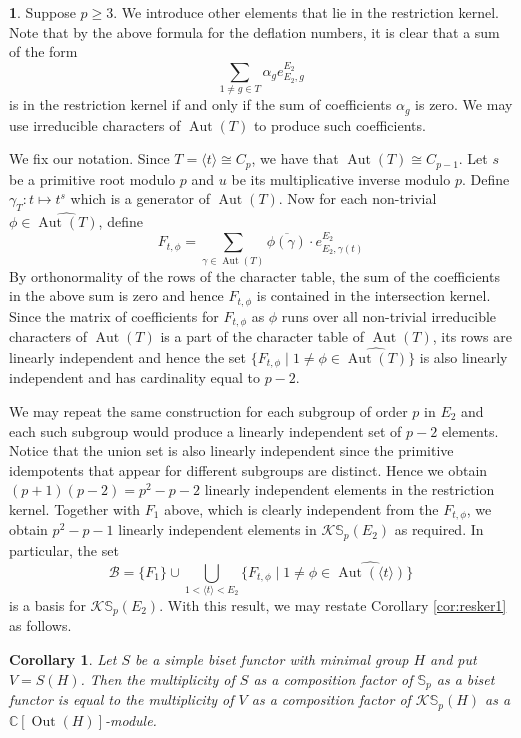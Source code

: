 \documentclass[12pt]{article}
\theoremstyle{plain}
\newtheorem{corollary}[theorem]{Corollary}
\theoremstyle{definition}
\newtheorem{nothing}[theorem]{}
\newcommand{\kerlin}{\mathbb S_p}
\newcommand{\out}{\operatorname{Out}}
\newcommand{\Aut}{\operatorname{Aut}}
\begin{document}
\begin{nothing} Suppose $p\ge 3$. We introduce other elements that lie in the restriction kernel. Note that by the above formula for the deflation numbers, it is clear that a sum of the form 
\[
\sum_{1\not = g\in T}\alpha_g e_{E_2, g}^{E_2}
\]
is in the restriction kernel if and only if the sum of coefficients $\alpha_g$ is zero. We may use irreducible characters of $\Aut(T)$ to produce such coefficients.

We fix our notation. Since $T=\langle t\rangle\cong C_p$, we have that $\Aut(T)\cong C_{p-1}$. Let $s$ be a primitive root modulo $p$ and $u$ be its multiplicative inverse modulo $p$. Define $\gamma_T: t\mapsto t^s$ which is a generator of $\Aut(T)$. Now for each non-trivial $\phi\in\widehat{\Aut(T)}$, define
\[
F_{t, \phi} = \sum_{\gamma\in\Aut(T)} \overline{\phi(\gamma)}\cdot e_{{E_2}, \gamma(t)}^{E_2}
\]
By orthonormality of the rows of the character table, the sum of the coefficients in the above sum is zero and hence $F_{t, \phi}$ is contained in the intersection kernel. Since the matrix of coefficients for $F_{t, \phi}$ as $\phi$ runs over all non-trivial irreducible characters of $\Aut(T)$ is a part of the character table of $\Aut(T)$, its rows are linearly independent and hence the set $\{ F_{t, \phi}\mid 1\not= \phi\in\widehat{\Aut(T)} \}$ is also linearly independent and has cardinality equal to $p-2$. 

We may repeat the same construction for each subgroup of order $p$ in $E_2$ and each such subgroup would produce a linearly independent set of $p-2$ elements. Notice that the union set is also linearly independent since the primitive idempotents that appear for different subgroups are distinct. Hence we obtain $(p+ 1)(p-2) = p^2 - p -2$ linearly independent elements in the restriction kernel. Together with $F_1$ above, which is clearly independent from the $F_{t, \phi}$, we obtain $p^2-p-1$ linearly independent elements in $\mathcal{K}\kerlin(E_2)$ as required. In particular, the set 
\begin{equation}\label{eqn:basisB}
\mathcal B = \{F_1\}\cup \bigcup_{1<\langle t\rangle < E_2} \{ F_{t, \phi}\mid 1\not =\phi\in\widehat{\Aut(\langle t\rangle)} \}
\end{equation}
is a basis for $\mathcal{K}\kerlin(E_2)$. With this result, we may restate Corollary \ref{cor:resker1} as follows.
\end{nothing}
\begin{corollary}\label{cor:resker2}
    Let $S$ be a simple biset functor with minimal group $H$ and put $V = S(H)$. Then the multiplicity of $S$ as a composition factor of $\kerlin$ as a biset functor is equal to the multiplicity of $V$ as a composition factor of $\mathcal K\kerlin(H)$ as a $\mathbb C[\out(H)]$-module.
\end{corollary}
\end{document}
